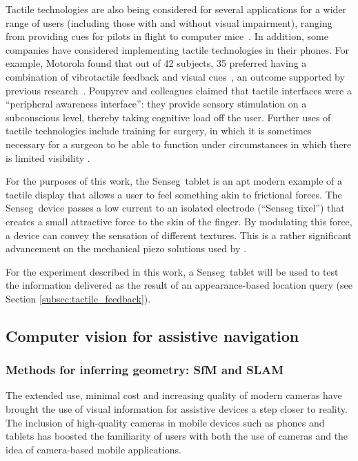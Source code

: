Tactile technologies are also being considered for several applications for a wider range of users (including those with and without visual impairment), ranging from providing cues for pilots in flight \citep{spirkovska2005summary} to computer mice~\citep{akamatsu1996movement}. In addition, some companies have considered implementing tactile technologies in their phones. For example, Motorola found that out of 42 subjects, 35 preferred having a combination of vibrotactile feedback and visual cues~\citep{chang2005audio}, an outcome supported by previous research~\citep{poupyrev2002ambient}. Poupyrev and colleagues claimed that tactile interfaces were a ``peripheral awareness interface'': they provide sensory stimulation on a subconscious level, thereby taking cognitive load off the user. Further uses of tactile technologies include training for surgery, in which it is sometimes necessary for a surgeon to be able to function under circumstances in which there is limited visibility \citep{hu2006effectiveness}.

For the purposes of this work, the Senseg\texttrademark\ tablet is an apt modern example of a tactile display that allows a user to feel something akin to frictional forces. The Senseg\texttrademark\ device  passes a low current to an isolated electrode (``Senseg tixel'') that creates a small attractive force to the skin of the finger. By modulating this force, a device can convey the sensation of different textures. This is a rather significant advancement on the mechanical piezo solutions used by \citet{bliss1970optical}. 

For the experiment described in this work, a Senseg\texttrademark\ tablet will be used to test the information delivered as the result of an appearance-based location query (see Section \ref{subsec:tactile_feedback}).

\subsection{Computer vision for assistive navigation}

\subsubsection{Methods for inferring geometry: SfM and SLAM}

The extended use, minimal cost and increasing quality of modern cameras have brought the use of visual information for assistive devices a step closer to reality. The inclusion of high-quality cameras in mobile devices such as phones and tablets has boosted the familiarity of users with both the use of cameras and the idea of camera-based mobile applications. 

